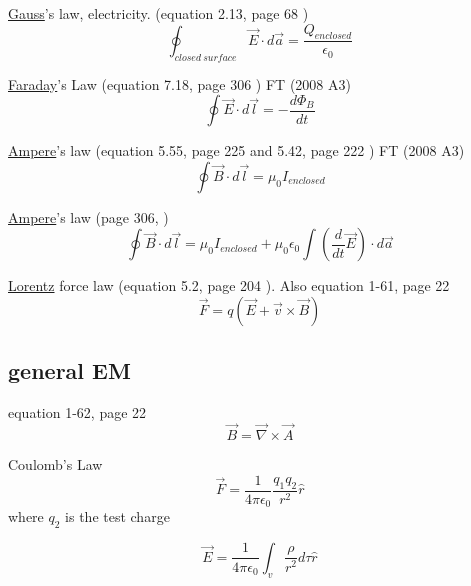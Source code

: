 \documentclass[12pt]{article}  %
\def\qualifyingyear{F}
\begin{document}
\underline{Gauss}'s law, electricity. (equation 2.13, page 68 \cite{GriffithED})
\begin{equation}
  \oint_{closed\ surface} \vec{E}\cdot d\vec{a} = \frac{Q_{enclosed}}{\epsilon_0}
	\label{eq:GaussLaw}
\end{equation}

\underline{Faraday}'s Law (equation 7.18, page 306 \cite{GriffithED}) 
\if\qualifyingyear T
(2008 A3)
\fi
\begin{equation}
  \oint \vec{E} \cdot d\vec{l} = - \frac{d\Phi _B}{dt}
	\label{eq:Faraday_law}
\end{equation}

\underline{Ampere}'s law (equation 5.55, page 225 and 5.42, page 222 \cite{GriffithED}) 
\if\qualifyingyear T
(2008 A3)
\fi
\begin{equation}
  \oint \vec{B} \cdot d\vec{l} = \mu_0 I_{enclosed}
	\label{eq:Ampere}
\end{equation}

\underline{Ampere}'s law (page 306, \cite{GriffithED})
\begin{equation}
  \oint \vec{B} \cdot d\vec{l} = \mu_0 I_{enclosed} + \mu_0 \epsilon_0 \int \left( \frac{d}{dt}\vec{E}\right) \cdot d\vec{a}
	\label{eq:Ampere_large}
\end{equation}

\underline{Lorentz} force law (equation 5.2, page 204 \cite{GriffithED}). Also equation 1-61, page 22 \cite{GoldsteinCM}
\begin{equation}
\vec{F} = q (\vec{E} + \vec{v}\times \vec{B})
\end{equation}

\subsection{general EM}

equation 1-62, page 22 \cite{GoldsteinCM}
\begin{equation}
\vec{B} = \vec{\nabla} \times \vec{A}
\end{equation}

Coulomb's Law
\begin{equation}
\vec{F} =\frac{1}{4\pi \epsilon _{0} } \frac{q_{1} q_{2} }{r^{2} } \hat{r}
\end{equation}
 where $q_{2} $ is the test charge

\begin{equation}
\vec{E}=\frac{1}{4\pi \epsilon_0} \int_v \frac{\rho}{r^2} d \tau \hat{r}
\end{equation}
\end{document}
